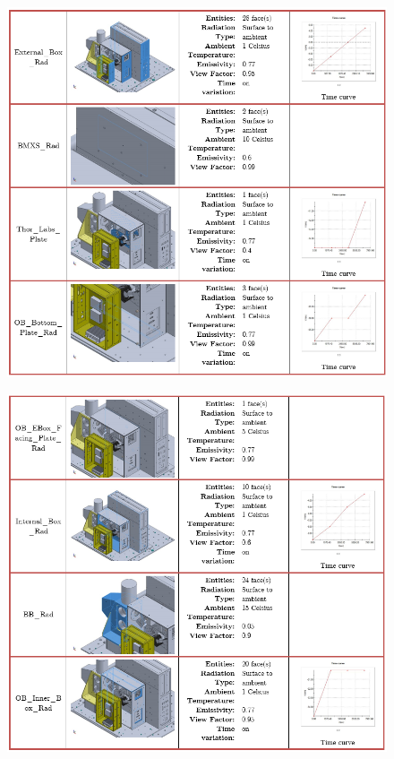 \begin{figure}
    \centering
    \includegraphics[width=\textwidth]{thermal_load_images/ascent_pt2_TL_images/ascesnt_pt2_5.PNG}
\end{figure}

\begin{figure}
    \centering
    \includegraphics[width=\textwidth]{thermal_load_images/ascent_pt2_TL_images/ascesnt_pt2_6.PNG}
\end{figure}

